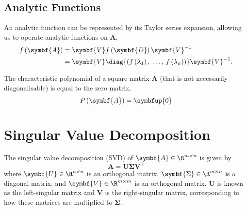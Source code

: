 \documentclass{article}
\begin{document}
\subsection{Analytic Functions}
An analytic function can be represented by its Taylor series expansion, allowing us to operate analytic functions on \(\symbf{A}\).
\begin{align*}
    f\left( \symbf{A} \right) & = \symbf{V} f\left( \symbf{D} \right) \symbf{V}^{-1}                                                               \\
                              & = \symbf{V} \diag{\left( f\left( \lambda_1 \right),\: \ldots,\: f\left( \lambda_n \right) \right)} \symbf{V}^{-1}.
\end{align*}
\begin{theorem}
    The characteristic polynomial of a square matrix \(\symbf{A}\) (that is not necessarily diagonalisable)
    is equal to the zero matrix.
    \begin{equation*}
        P\left( \symbf{A} \right) = \symbfup{0}
    \end{equation*}
\end{theorem}
\section{Singular Value Decomposition}
The singular value decomposition (SVD) of \(\symbf{A} \in \R^{m \times n}\) is given by
\begin{equation*}
    \symbf{A} = \symbf{U} \symbf{\Sigma} \symbf{V}^\top
\end{equation*}
where \(\symbf{U} \in \R^{n \times n}\) is an orthogonal matrix, \(\symbf{\Sigma} \in \R^{m \times n}\)
is a diagonal matrix, and \(\symbf{V} \in  \R^{m \times m}\) is
an orthogonal matrix.
\(\symbf{U}\) is known as the left-singular matrix and \(\symbf{V}\) is the right-singular matrix,
corresponding to how these matrices are multiplied to \(\symbf{\Sigma}\).
\end{document}
